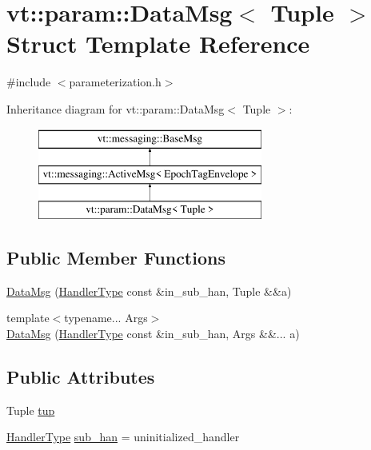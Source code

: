 \hypertarget{structvt_1_1param_1_1_data_msg}{}\section{vt\+:\+:param\+:\+:Data\+Msg$<$ Tuple $>$ Struct Template Reference}
\label{structvt_1_1param_1_1_data_msg}


{\ttfamily \#include $<$parameterization.\+h$>$}

Inheritance diagram for vt\+:\+:param\+:\+:Data\+Msg$<$ Tuple $>$\+:\begin{figure}[H]
\begin{center}
\leavevmode
\includegraphics[height=3.000000cm]{structvt_1_1param_1_1_data_msg}
\end{center}
\end{figure}
\subsection*{Public Member Functions}
\begin{DoxyCompactItemize}
\item 
\hyperlink{structvt_1_1param_1_1_data_msg_a9aa000cf8ea52f4b3e281153e8e94fe8}{Data\+Msg} (\hyperlink{namespacevt_af64846b57dfcaf104da3ef6967917573}{Handler\+Type} const \&in\+\_\+sub\+\_\+han, Tuple \&\&a)
\item 
{\footnotesize template$<$typename... Args$>$ }\\\hyperlink{structvt_1_1param_1_1_data_msg_aae3d76ec2fbfda18cb8131cb41444e76}{Data\+Msg} (\hyperlink{namespacevt_af64846b57dfcaf104da3ef6967917573}{Handler\+Type} const \&in\+\_\+sub\+\_\+han, Args \&\&... a)
\end{DoxyCompactItemize}
\subsection*{Public Attributes}
\begin{DoxyCompactItemize}
\item 
Tuple \hyperlink{structvt_1_1param_1_1_data_msg_aa607f9d80d37b1c72f284ea3048e5788}{tup}
\item 
\hyperlink{namespacevt_af64846b57dfcaf104da3ef6967917573}{Handler\+Type} \hyperlink{structvt_1_1param_1_1_data_msg_a5356937e3d47eff93d8b0c59247c5809}{sub\+\_\+han} = uninitialized\+\_\+handler
\end{DoxyCompactItemize}
